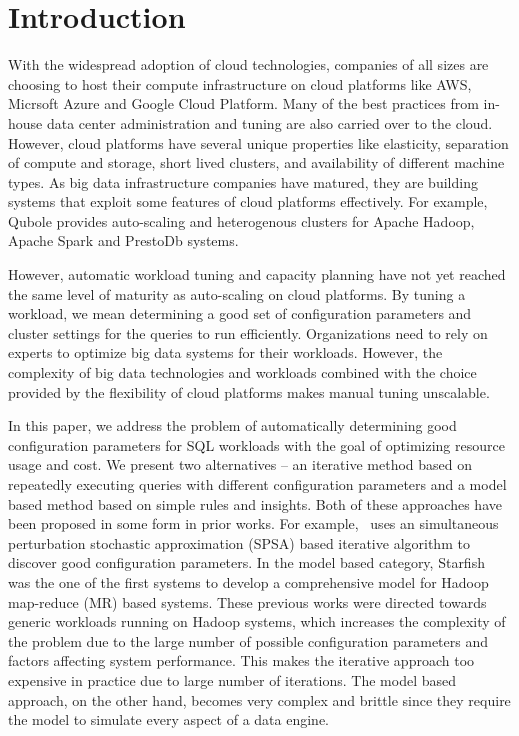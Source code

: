 \section{Introduction}

With the widespread adoption of cloud technologies, companies of all sizes are choosing to host their compute infrastructure on cloud platforms like AWS, Micrsoft Azure and Google Cloud Platform. 
Many of the best practices from in-house data center administration and tuning are also carried over to the cloud. However, cloud platforms have several unique properties like elasticity, separation of compute and storage, short lived clusters, and availability of different machine types. As big data infrastructure companies have matured, they are building systems that exploit some features of cloud platforms effectively. For example, Qubole provides auto-scaling 
and heterogenous clusters for Apache Hadoop, Apache Spark and PrestoDb systems. 

However, automatic workload tuning and capacity planning have not yet reached the same level of maturity as auto-scaling on cloud platforms. By tuning a workload, we mean determining a good set of configuration parameters and cluster settings for the queries to run efficiently. Organizations need to rely on experts to optimize big data systems for their workloads. However, the 
complexity of big data technologies and workloads combined with the choice provided by the flexibility of cloud platforms makes manual tuning unscalable. 

In this paper, we address the problem of automatically determining good configuration parameters for SQL workloads with the goal of optimizing resource usage and cost. We present two alternatives -- an iterative method based on repeatedly executing queries with different configuration parameters and a model based method based on simple rules and insights. Both of these approaches have been proposed in some form in prior works. For example,~\cite{KumarPLPGB16} uses an simultaneous perturbation stochastic approximation (SPSA) based iterative algorithm to discover good configuration parameters. In the model based category, Starfish~\cite{herodotou2011profiling, herodotou2011starfish} was the one of the first systems to develop a comprehensive model for Hadoop map-reduce (MR) based systems. These previous works were directed towards generic workloads running on Hadoop systems, which increases the complexity of the problem due to the large number of possible configuration parameters and factors affecting system performance. This makes the iterative approach too expensive in practice due to large number of iterations. The model based approach, on the other hand, becomes very complex and brittle since they require the model to simulate every aspect of a data engine.

